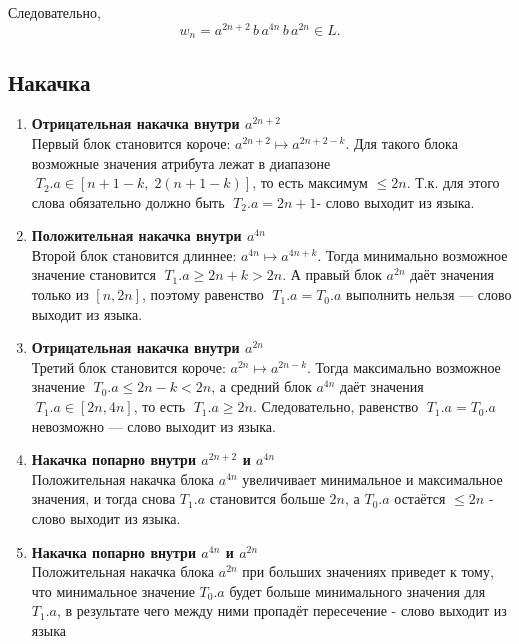\documentclass[12pt,a4paper]{article}
\begin{document}
Следовательно,
\[
w_n = a^{2n+2}\,b\,a^{4n}\,b\,a^{2n}\in L.
\]

\subsection*{Накачка}

\begin{enumerate}
  \item \textbf{Отрицательная накачка внутри \(a^{2n+2}\)}\\
  Первый блок становится короче: \(a^{2n+2}\mapsto a^{2n+2-k}\).
  Для такого блока возможные значения атрибута лежат в диапазоне
  \(\;T_2.a\in[n+1-k,\;2(n+1-k)]\), то есть максимум \(\le 2n\).
  Т.к. для этого слова обязательно должно быть \(\;T_2.a = 2n+1\)- слово выходит из языка.

  \item \textbf{Положительная накачка внутри \(a^{4n}\)}\\
  Второй блок становится длиннее: \(a^{4n}\mapsto a^{4n+k}\).
  Тогда минимально возможное значение становится \(\;T_1.a \ge 2n+k > 2n\).
  А правый блок \(a^{2n}\) даёт значения только из \([n,2n]\), поэтому
  равенство \(\;T_1.a = T_0.a\) выполнить нельзя — слово выходит из языка.

  \item \textbf{Отрицательная накачка внутри \(a^{2n}\)}\\
  Третий блок становится короче: \(a^{2n}\mapsto a^{2n-k}\).
  Тогда максимально возможное значение \(\;T_0.a \le 2n-k < 2n\),
  а средний блок \(a^{4n}\) даёт значения \(\;T_1.a \in [2n,4n]\), то есть \(\;T_1.a\ge 2n\).
  Следовательно, равенство \(\;T_1.a = T_0.a\) невозможно — слово выходит из языка.

  \item \textbf{Накачка попарно внутри $a^{2n+2}$ и $a^{4n}$}\\
  Положительная накачка блока $a^{4n}$ увеличивает минимальное и максимальное значения, и тогда снова $T_1.a$ становится больше $2n$, а $T_0.a$ остаётся $\le 2n$ - слово выходит из языка.

  \item \textbf{Накачка попарно внутри $a^{4n}$ и $a^{2n}$}\\
  Положительная накачка блока $a^{2n}$ при больших значениях приведет к тому, что минимальное значение $T_0.a$ будет больше минимального значения для $T_1.a$, в результате чего между ними пропадёт пересечение - слово выходит из языка
\end{enumerate}
\end{document}
